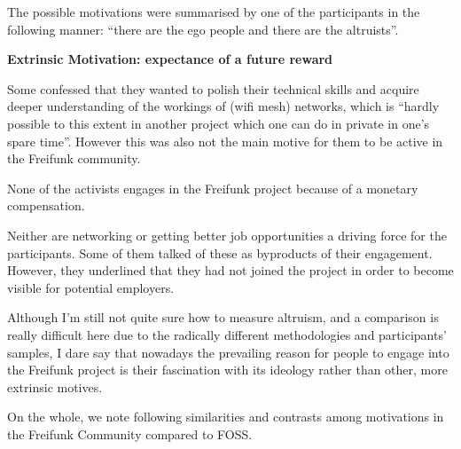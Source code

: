 The possible motivations were summarised by one of the participants in the following manner: ``there are the ego people and there are the altruists''.


\textbf{Extrinsic Motivation: expectance of a future reward}

Some confessed that they wanted to polish their technical skills and acquire deeper understanding of the workings of (wifi mesh) networks, which is ``hardly possible to this extent in another project which one can do in private in one's spare time''.
However this was also not the main motive for them to be active in the Freifunk community.

None of the activists engages in the Freifunk project because of a monetary compensation.

Neither are networking or getting better job opportunities a driving force for the participants.
Some of them talked of these as byproducts of their engagement.
However, they underlined that they had not joined the project in order to become visible for potential employers.





Although I'm still not quite sure how to measure altruism, and a comparison is really difficult here due to the radically different methodologies and participants' samples, I dare say that nowadays the prevailing reason for people to engage into the Freifunk project is their fascination with its ideology rather than other, more extrinsic motives.



On the whole, we note following similarities and contrasts among motivations in the Freifunk Community compared to FOSS.

